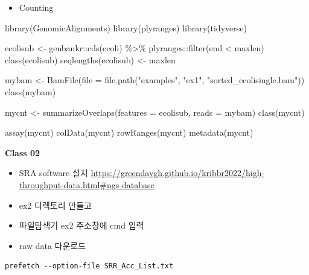 \documentclass[
]{book}
\newenvironment{Shaded}{\begin{snugshade}}{\end{snugshade}}
\newcommand{\AttributeTok}[1]{\textcolor[rgb]{0.77,0.63,0.00}{#1}}
\newcommand{\FunctionTok}[1]{\textcolor[rgb]{0.00,0.00,0.00}{#1}}
\newcommand{\NormalTok}[1]{#1}
\newcommand{\OtherTok}[1]{\textcolor[rgb]{0.56,0.35,0.01}{#1}}
\newcommand{\SpecialCharTok}[1]{\textcolor[rgb]{0.00,0.00,0.00}{#1}}
\newcommand{\StringTok}[1]{\textcolor[rgb]{0.31,0.60,0.02}{#1}}
\providecommand{\tightlist}{%
  \setlength{\itemsep}{0pt}\setlength{\parskip}{0pt}}
\begin{document}
\begin{itemize}
\tightlist
\item
  Counting
\end{itemize}

\begin{Shaded}
\begin{Highlighting}[]
\FunctionTok{library}\NormalTok{(GenomicAlignments)}
\FunctionTok{library}\NormalTok{(plyranges)}
\FunctionTok{library}\NormalTok{(tidyverse)}

\NormalTok{ecolisub }\OtherTok{\textless{}{-}}\NormalTok{ genbankr}\SpecialCharTok{::}\FunctionTok{cds}\NormalTok{(ecoli) }\SpecialCharTok{\%\textgreater{}\%} 
\NormalTok{  plyranges}\SpecialCharTok{::}\FunctionTok{filter}\NormalTok{(end }\SpecialCharTok{\textless{}}\NormalTok{ maxlen)}
\FunctionTok{class}\NormalTok{(ecolisub)}
\FunctionTok{seqlengths}\NormalTok{(ecolisub) }\OtherTok{\textless{}{-}}\NormalTok{ maxlen}

\NormalTok{mybam }\OtherTok{\textless{}{-}} \FunctionTok{BamFile}\NormalTok{(}\AttributeTok{file =} \FunctionTok{file.path}\NormalTok{(}\StringTok{"examples"}\NormalTok{, }\StringTok{"ex1"}\NormalTok{, }\StringTok{"sorted\_ecolisingle.bam"}\NormalTok{))}
\FunctionTok{class}\NormalTok{(mybam)}

\NormalTok{mycnt }\OtherTok{\textless{}{-}} \FunctionTok{summarizeOverlaps}\NormalTok{(}\AttributeTok{features =}\NormalTok{ ecolisub, }
                  \AttributeTok{reads =}\NormalTok{ mybam)}
\FunctionTok{class}\NormalTok{(mycnt)}


\FunctionTok{assay}\NormalTok{(mycnt)}
\FunctionTok{colData}\NormalTok{(mycnt)}
\FunctionTok{rowRanges}\NormalTok{(mycnt)}
\FunctionTok{metadata}\NormalTok{(mycnt)}
\end{Highlighting}
\end{Shaded}

\textbf{Class 02}

\begin{itemize}
\tightlist
\item
  SRA software 설치 \url{https://greendaygh.github.io/kribbr2022/high-throughput-data.html\#ngs-database}
\item
  ex2 디렉토리 만들고
\item
  파일탐색기 ex2 주소창에 cmd 입력
\item
  raw data 다운로드
\end{itemize}

\begin{verbatim}
prefetch --option-file SRR_Acc_List.txt
\end{verbatim}
\end{document}
